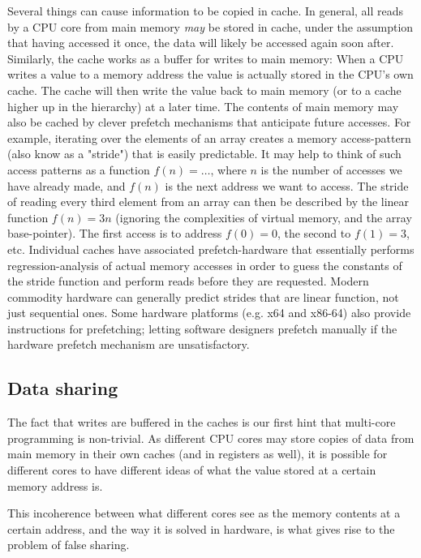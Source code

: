Several things can cause information to be copied in cache. In general, all
reads by a CPU core from main memory \textit{may} be stored in cache, under the
assumption that having accessed it once, the data will likely be accessed
again soon after. Similarly, the cache works as a buffer for writes to main
memory: When a CPU writes a value to a memory address the value is actually
stored in the CPU's own cache. The cache will then write the value back to main
memory (or to a cache higher up in the hierarchy) at a later time. The contents of main memory may also be cached by clever
prefetch mechanisms that anticipate future accesses. For example, iterating over
the elements of an array creates a memory access-pattern (also know as a
"stride") that is easily predictable. It may help to think of such access
patterns as a function $f(n) = \ldots$, where $n$ is the number of accesses we
have already made, and $f(n)$ is the next address we want to access. The stride
of reading every third element from an array can then be described by the linear
function $f(n) = 3n$ (ignoring the complexities of virtual memory, and the array
base-pointer). The first access is to address $f(0) = 0$, the second to $f(1) =
3$, etc. Individual caches have associated prefetch-hardware that essentially
performs regression-analysis of actual memory accesses in order to guess the
constants of the stride function and perform reads before they are requested.
Modern commodity hardware can generally predict strides that are linear
function, not just sequential ones. Some hardware platforms (e.g. x64 and x86-64)
also provide instructions for prefetching; letting software designers prefetch
manually if the hardware prefetch mechanism are
unsatisfactory\cite{whatprogrammersshouldknow}.

\subsection{Data sharing}
The fact that writes are buffered in the caches is our first hint that
multi-core programming is non-trivial. As different CPU cores may store copies
of data from main memory in their own caches (and in registers as well), it is
possible for different cores to have different ideas of what the value stored at
a certain memory address is.


This incoherence between what different cores see as the memory contents at a
certain address, and the way it is solved in hardware, is what gives rise to the
problem of false sharing.

